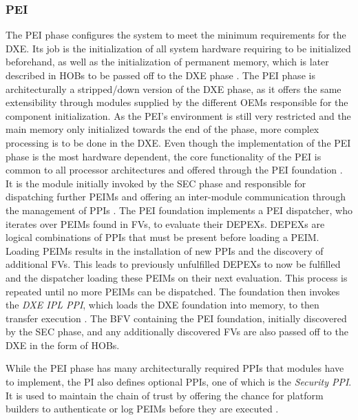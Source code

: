 \subsubsection{\acf{PEI}}

The \ac{PEI} phase configures the system to meet the minimum requirements for the \ac{DXE}.
Its job is the initialization of all system hardware requiring to be initialized beforehand, as well as the initialization of permanent memory, which is later described in \acp{HOB} to be passed off to the \ac{DXE} phase \cite[Vol. 1, 2.1]{pi-spec}.
The \ac{PEI} phase is architecturally a stripped\-/down version of the \ac{DXE} phase, as it offers the same extensibility through modules supplied by the different \acp{OEM} responsible for the component initialization.
As the \ac{PEI}'s environment is still very restricted and the main memory only initialized towards the end of the phase, more complex processing is to be done in the \ac{DXE}.
Even though the implementation of the \ac{PEI} phase is the most hardware dependent, the core functionality of the \ac{PEI} is common to all processor architectures and offered through the \ac{PEI} foundation \cite[Vol. 1, 2.2]{pi-spec}.
It is the module initially invoked by the \ac{SEC} phase and responsible for dispatching further \acp{PEIM} and offering an inter-module communication through the management of \acp{PPI} \cite[Vol. 1, 2.5]{pi-spec}.
The \ac{PEI} foundation implements a \ac{PEI} dispatcher, who iterates over \acp{PEIM} found in \acp{FV}, to evaluate their \acp{DEPEX}.
\acp{DEPEX} are logical combinations of \acp{PPI} that must be present before loading a \ac{PEIM}.
Loading \acp{PEIM} results in the installation of new \acp{PPI} and the discovery of additional \acp{FV}.
This leads to previously unfulfilled \acp{DEPEX} to now be fulfilled and the dispatcher loading these \acp{PEIM} on their next evaluation.
This process is repeated until no more \acp{PEIM} can be dispatched.
The foundation then invokes the \emph{\ac{DXE} IPL \ac{PPI}}, which loads the \ac{DXE} foundation into memory, to then transfer execution \cite[Vol. 1, 2.6]{pi-spec}.
The \ac{BFV} containing the \ac{PEI} foundation, initially discovered by the \ac{SEC} phase, and any additionally discovered \acp{FV} are also passed off to the \ac{DXE} in the form of \acp{HOB}.

While the \ac{PEI} phase has many architecturally required \acp{PPI} that modules have to implement, the \ac{PI} also defines optional \acp{PPI}, one of which is the \emph{Security PPI}.
It is used to maintain the chain of trust by offering the chance for platform builders to authenticate or log \acp{PEIM} before they are executed \cite[Vol. 1, 6.3.6]{pi-spec}.


